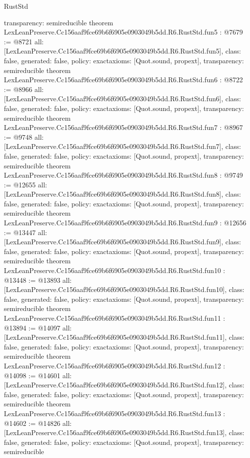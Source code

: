 \begin{lexlean}{RustStd}
\begin{coremodule}
{  transparency: semireducible
}
theorem LexLeanPreserve.Cc156aaf9fce69b6f6905e0903049b5dd.R6.RustStd.fun5 : @7679 := @8721 {
  all: [LexLeanPreserve.Cc156aaf9fce69b6f6905e0903049b5dd.R6.RustStd.fun5],
  class: false,
  generated: false,
  policy: exact{axioms: [Quot.sound, propext]},
  transparency: semireducible
}
theorem LexLeanPreserve.Cc156aaf9fce69b6f6905e0903049b5dd.R6.RustStd.fun6 : @8722 := @8966 {
  all: [LexLeanPreserve.Cc156aaf9fce69b6f6905e0903049b5dd.R6.RustStd.fun6],
  class: false,
  generated: false,
  policy: exact{axioms: [Quot.sound, propext]},
  transparency: semireducible
}
theorem LexLeanPreserve.Cc156aaf9fce69b6f6905e0903049b5dd.R6.RustStd.fun7 : @8967 := @9748 {
  all: [LexLeanPreserve.Cc156aaf9fce69b6f6905e0903049b5dd.R6.RustStd.fun7],
  class: false,
  generated: false,
  policy: exact{axioms: [Quot.sound, propext]},
  transparency: semireducible
}
theorem LexLeanPreserve.Cc156aaf9fce69b6f6905e0903049b5dd.R6.RustStd.fun8 : @9749 := @12655 {
  all: [LexLeanPreserve.Cc156aaf9fce69b6f6905e0903049b5dd.R6.RustStd.fun8],
  class: false,
  generated: false,
  policy: exact{axioms: [Quot.sound, propext]},
  transparency: semireducible
}
theorem LexLeanPreserve.Cc156aaf9fce69b6f6905e0903049b5dd.R6.RustStd.fun9 : @12656 := @13447 {
  all: [LexLeanPreserve.Cc156aaf9fce69b6f6905e0903049b5dd.R6.RustStd.fun9],
  class: false,
  generated: false,
  policy: exact{axioms: [Quot.sound, propext]},
  transparency: semireducible
}
theorem LexLeanPreserve.Cc156aaf9fce69b6f6905e0903049b5dd.R6.RustStd.fun10 : @13448 := @13893 {
  all: [LexLeanPreserve.Cc156aaf9fce69b6f6905e0903049b5dd.R6.RustStd.fun10],
  class: false,
  generated: false,
  policy: exact{axioms: [Quot.sound, propext]},
  transparency: semireducible
}
theorem LexLeanPreserve.Cc156aaf9fce69b6f6905e0903049b5dd.R6.RustStd.fun11 : @13894 := @14097 {
  all: [LexLeanPreserve.Cc156aaf9fce69b6f6905e0903049b5dd.R6.RustStd.fun11],
  class: false,
  generated: false,
  policy: exact{axioms: [Quot.sound, propext]},
  transparency: semireducible
}
theorem LexLeanPreserve.Cc156aaf9fce69b6f6905e0903049b5dd.R6.RustStd.fun12 : @14098 := @14601 {
  all: [LexLeanPreserve.Cc156aaf9fce69b6f6905e0903049b5dd.R6.RustStd.fun12],
  class: false,
  generated: false,
  policy: exact{axioms: [Quot.sound, propext]},
  transparency: semireducible
}
theorem LexLeanPreserve.Cc156aaf9fce69b6f6905e0903049b5dd.R6.RustStd.fun13 : @14602 := @14826 {
  all: [LexLeanPreserve.Cc156aaf9fce69b6f6905e0903049b5dd.R6.RustStd.fun13],
  class: false,
  generated: false,
  policy: exact{axioms: [Quot.sound, propext]},
  transparency: semireducible
}
\end{coremodule}
\end{lexlean}
